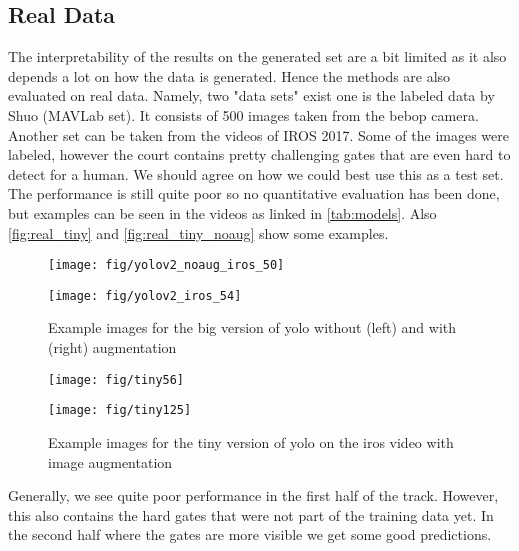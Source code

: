 \documentclass{article}
\begin{document}
\subsection{Real Data}

The interpretability of the results on the generated set are a bit limited as it also depends a lot on how the data is generated. Hence the methods are also evaluated on real data. Namely, two "data sets" exist one is the labeled data by Shuo (MAVLab set). It consists of 500 images taken from the bebop camera. Another set can be taken from the videos of IROS 2017. Some of the images were labeled, however the court contains pretty challenging gates that are even hard to detect for a human. We should agree on how we could best use this as a test set. The performance is still quite poor so no quantitative evaluation has been done, but examples can be seen in the videos as linked in \autoref{tab:models}. Also \autoref{fig:real_tiny} and \autoref{fig:real_tiny_noaug} show some examples.

\begin{figure}[htbp]
	\centering
	
	\begin{minipage}{0.49\textwidth}
		\centering
		\texttt{[image: fig/yolov2\_noaug\_iros\_50]}
	\end{minipage}
	\begin{minipage}{0.49\textwidth}
		\centering
		\texttt{[image: fig/yolov2\_iros\_54]}
	\end{minipage}
	\caption{Example images for the big version of yolo without (left) and with (right) augmentation}
	\label{fig:real_tiny_noaug}
	
	\begin{minipage}{0.49\textwidth}
		\centering
		\texttt{[image: fig/tiny56]}
	\end{minipage}
	\begin{minipage}{0.49\textwidth}
		\centering
		\texttt{[image: fig/tiny125]}
	\end{minipage}
	\caption{Example images for the tiny version of yolo on the iros video with image augmentation}
	\label{fig:real_tiny}
\end{figure}

Generally, we see quite poor performance in the first half of the track. However, this also contains the hard gates that were not part of the training data yet. In the second half where the gates are more visible we get some good predictions.
\end{document}
